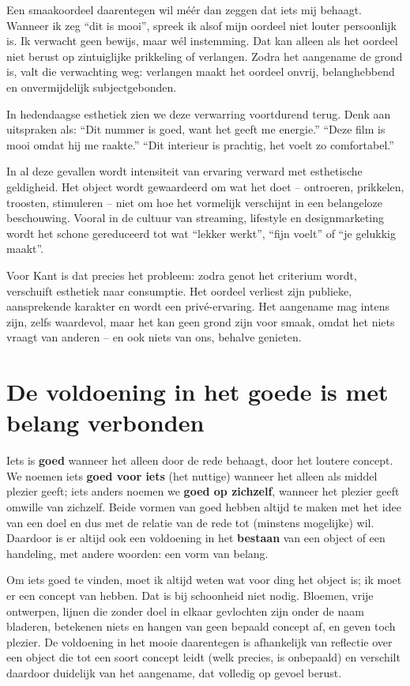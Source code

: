 \begin{mdframed}[leftmargin=0pt,rightmargin=0pt,backgroundcolor=blue!6,linecolor=white,innertopmargin=6pt,innerbottommargin=6pt]
Een smaakoordeel daarentegen wil méér dan zeggen dat iets mij behaagt. 
Wanneer ik zeg “dit is mooi”, spreek ik alsof mijn oordeel niet louter persoonlijk is. 
Ik verwacht geen bewijs, maar wél instemming. Dat kan alleen als het oordeel niet berust op zintuiglijke prikkeling of verlangen. 
Zodra het aangename de grond is, valt die verwachting weg: verlangen maakt het oordeel onvrij, belanghebbend en onvermijdelijk subjectgebonden.

In hedendaagse esthetiek zien we deze verwarring voortdurend terug. Denk aan uitspraken als:
“Dit nummer is goed, want het geeft me energie.”
“Deze film is mooi omdat hij me raakte.”
“Dit interieur is prachtig, het voelt zo comfortabel.”

In al deze gevallen wordt intensiteit van ervaring verward met esthetische geldigheid. 
Het object wordt gewaardeerd om wat het doet -- ontroeren, prikkelen, troosten, stimuleren -- niet om hoe het vormelijk verschijnt in een belangeloze beschouwing. 
Vooral in de cultuur van streaming, lifestyle en designmarketing wordt het schone gereduceerd tot wat “lekker werkt”, “fijn voelt” of “je gelukkig maakt”.

Voor Kant is dat precies het probleem: zodra genot het criterium wordt, verschuift esthetiek naar consumptie. 
Het oordeel verliest zijn publieke, aansprekende karakter en wordt een privé-ervaring. 
Het aangename mag intens zijn, zelfs waardevol, maar het kan geen grond zijn voor smaak, omdat het niets vraagt van anderen -- en ook niets van ons, behalve genieten.

\end{mdframed}

\section{De voldoening in het goede is met belang verbonden}

Iets is \textbf{goed} wanneer het alleen door de rede behaagt, door het loutere concept.
We noemen iets \textbf{goed voor iets} (het nuttige) wanneer het alleen als middel plezier geeft; iets anders noemen we \textbf{goed op zichzelf}, wanneer het plezier geeft omwille van zichzelf. 
Beide vormen van goed hebben altijd te maken met het idee van een doel en dus met de relatie van de rede tot (minstens mogelijke) wil. 
Daardoor is er altijd ook een voldoening in het \textbf{bestaan} van een object of een handeling, met andere woorden: een vorm van belang.

Om iets goed te vinden, moet ik altijd weten wat voor ding het object is; ik moet er een concept van hebben. 
Dat is bij schoonheid niet nodig. 
Bloemen, vrije ontwerpen, lijnen die zonder doel in elkaar gevlochten zijn onder de naam bladeren, betekenen niets en hangen van geen bepaald concept af, en geven toch plezier. 
De voldoening in het mooie daarentegen is afhankelijk van reflectie over een object die tot een soort concept leidt (welk precies, is onbepaald) en verschilt daardoor duidelijk van het aangename, dat volledig op gevoel berust.

